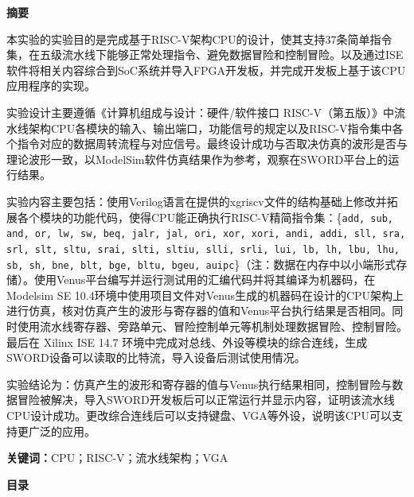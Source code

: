 \documentclass[UTF8,a4paper,autofakebold,15pt]{ctexart}
\begin{document}
\newpage

	
	\begin{center}
		{\bf 摘\quad 要}
	\end{center}
	
	
	本实验的实验目的是完成基于RISC-V架构CPU的设计，使其支持37条简单指令集，在五级流水线下能够正常处理指令、避免数据冒险和控制冒险。以及通过ISE软件将相关内容综合到SoC系统并导入FPGA开发板，并完成开发板上基于该CPU应用程序的实现。
	
	实验设计主要遵循《计算机组成与设计：硬件/软件接口 RISC-V（第五版）》\cite{ref1}中流水线架构CPU各模块的输入、输出端口，功能信号的规定以及RISC-V指令集中各个指令对应的数据周转流程与对应信号。最终设计成功与否取决仿真的波形是否与理论波形一致，以ModelSim软件仿真结果作为参考，观察在SWORD平台上的运行结果。
	
	实验内容主要包括：使用Verilog语言在提供的xgriscv文件的结构基础上修改并拓展各个模块的功能代码，使得CPU能正确执行RISC-V精简指令集：\{{\tt add, sub, and, or, lw, sw, beq, jalr, jal, ori, xor, xori, andi, addi, sll, sra, srl, slt, sltu, srai, slti, sltiu, slli, srli, lui, lb, lh, lbu, lhu, sb, sh, bne, blt, bge, bltu, bgeu, auipc}\}（注：数据在内存中以小端形式存储）。使用Venus平台编写并运行测试用的汇编代码并将其编译为机器码，在Modelsim SE 10.4环境中使用项目文件对Venus生成的机器码在设计的CPU架构上进行仿真，核对仿真产生的波形与寄存器的值和Venus平台执行结果是否相同。同时使用流水线寄存器、旁路单元、冒险控制单元等机制处理数据冒险、控制冒险。最后在 Xilinx ISE 14.7 环境中完成对总线、外设等模块的综合连线，生成SWORD设备可以读取的比特流，导入设备后测试使用情况。
	
	实验结论为：仿真产生的波形和寄存器的值与Venus执行结果相同，控制冒险与数据冒险被解决，导入SWORD开发板后可以正常运行并显示内容，证明该流水线CPU设计成功。更改综合连线后可以支持键盘、VGA等外设，说明该CPU可以支持更广泛的应用。
	
	
	{\bf 关键词：}CPU；RISC-V；流水线架构；VGA
	
\newpage

	
	\begin{center}
		{\bf 目\quad 录}
	\end{center}
	
	
	\renewcommand{\contentsname}{}
	
	\tableofcontents
	
\newpage
\end{document}

